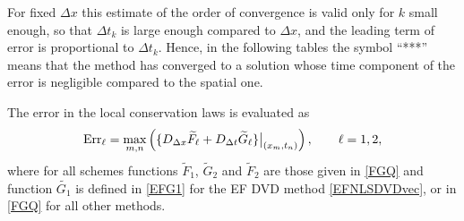 \documentclass[twoside]{article}
\numberwithin{equation}{section}
\begin{document}
For fixed $\Delta x$ this estimate of the order of convergence is valid only for $k$ small enough, so that $\Delta t_k$ is large enough compared to $\Delta x$, and the leading term of error is proportional to $\Delta t_k$. Hence, in the following tables the symbol ``***'' means that the method has converged to a solution whose time component of the error is negligible compared to the spatial one.

The error in the local conservation laws is evaluated as
$$
{\rm Err}_\ell=\max_{m,n}\left(\{D_{\Delta x}\widetilde{F}_\ell+D_{\Delta t}\widetilde{G}_\ell\}\big\vert_{(x_m,t_n)}\right),\qquad \ell=1,2,
$$
where for all schemes functions $\widetilde{F}_1$, $\widetilde{G}_2$ and $\widetilde{F}_2$ are those given in \eqref{FGQ} and function $\widetilde{G_1}$ is defined in \eqref{EFG1} for the EF DVD method \eqref{EFNLSDVDvec}, or in \eqref{FGQ} for all other methods. 
\end{document}
